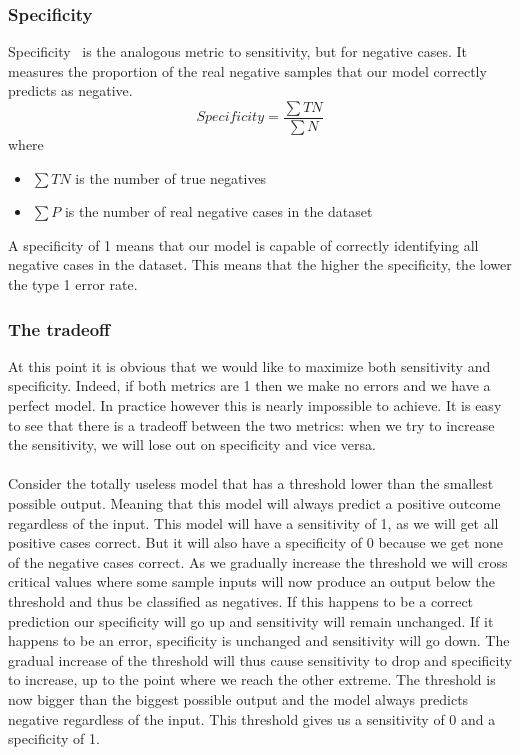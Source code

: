 \subsubsection{Specificity}
Specificity~\cite{wikisensspec} is the analogous metric to sensitivity, but for negative cases. It measures the proportion of the real negative samples that our model correctly predicts as negative.
$$
Specificity = \frac{\sum{TN}}{\sum{N}}
$$
where
\begin{itemize}
\item $\sum{TN}$ is the number of true negatives
\item $\sum{P}$ is the number of real negative cases in the dataset
\end{itemize}
A specificity of 1 means that our model is capable of correctly identifying all negative cases in the dataset. This means that the higher the specificity, the lower the type 1 error rate.
\subsubsection{The tradeoff}
At this point it is obvious that we would like to maximize both sensitivity and specificity. Indeed, if both metrics are 1 then we make no errors and we have a perfect model. In practice however this is nearly impossible to achieve. It is easy to see that there is a tradeoff between the two metrics: when we try to increase the sensitivity, we will lose out on specificity and vice versa. \\ \\ 
Consider the totally useless model that has a threshold lower than the smallest possible output. Meaning that this model will always predict a positive outcome regardless of the input. This model will have a sensitivity of 1, as we will get all positive cases correct. But it will also have a specificity of 0 because we get none of the negative cases correct. As we gradually increase the threshold we will cross critical values where some sample inputs will now produce an output below the threshold and thus be classified as negatives. If this happens to be a correct prediction our specificity will go up and sensitivity will remain unchanged. If it happens to be an error, specificity is unchanged and sensitivity will go down. The gradual increase of the threshold will thus cause sensitivity to drop and specificity to increase, up to the point where we reach the other extreme. The threshold is now bigger than the biggest possible output and the model always predicts negative regardless of the input. This threshold gives us a sensitivity of 0 and a specificity of 1.
